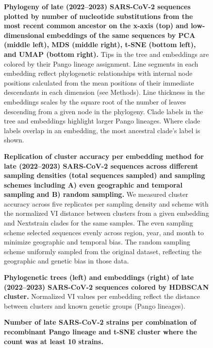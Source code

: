 \documentclass[webpdf,contemporary,large,single]{oup-authoring-template}%
\theoremstyle{thmstyleone}%
\theoremstyle{thmstyletwo}%
\theoremstyle{thmstylethree}%
\begin{document}
\begin{figure}[H]
\caption{{\bf Phylogeny of late (2022--2023) SARS-CoV-2 sequences plotted by number of nucleotide substitutions from the most recent common ancestor on the x-axis (top) and low-dimensional embeddings of the same sequences by PCA (middle left), MDS (middle right), t-SNE (bottom left), and UMAP (bottom right).}
  Tips in the tree and embeddings are colored by their Pango lineage assignment.
  Line segments in each embedding reflect phylogenetic relationships with internal node positions calculated from the mean positions of their immediate descendants in each dimension (see Methods).
  Line thickness in the embeddings scales by the square root of the number of leaves descending from a given node in the phylogeny.
  Clade labels in the tree and embeddings highlight larger Pango lineages.
  Where clade labels overlap in an embedding, the most ancestral clade's label is shown.
}
\label{S_Fig_sarscov2_late_embeddings_by_Pango}
\end{figure}

\begin{figure}[H]
\caption{{\bf Replication of cluster accuracy per embedding method for late (2022--2023) SARS-CoV-2 sequences across different sampling densities (total sequences sampled) and sampling schemes including A) even geographic and temporal sampling and B) random sampling.}
  We measured cluster accuracy across five replicates per sampling density and scheme with the normalized VI distance between clusters from a given embedding and Nextstrain clades for the same samples.
  The even sampling scheme selected sequences evenly across region, year, and month to minimize geographic and temporal bias.
  The random sampling scheme uniformly sampled from the original dataset, reflecting the geographic and genetic bias in those data.
}\label{S_Fig_late_sarscov2_replication_of_cluster_accuracy}
\end{figure}

\begin{figure}[H]
\caption{{\bf Phylogenetic trees (left) and embeddings (right) of late (2022--2023) SARS-CoV-2 sequences colored by HDBSCAN cluster.}
  Normalized VI values per embedding reflect the distance between clusters and known genetic groups (Pango lineages).
}\label{S_Fig_sarscov2_late_embeddings_by_cluster_vs_Nextclade_pango}
\end{figure}

\begin{figure}[H]
\caption{{\bf Number of late SARS-CoV-2 strains per combination of recombinant Pango lineage and t-SNE cluster where the count was at least 10 strains.}}\label{S_Fig_sarscov2_late_embeddings_tsne_recombinant_counts}
\end{figure}
\end{document}
